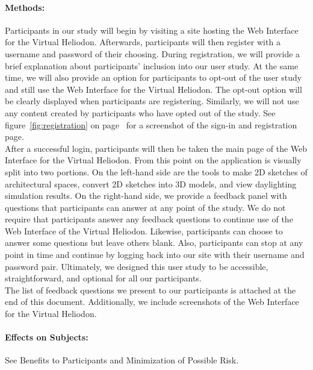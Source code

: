 \documentclass[12pt]{article}
\begin{document}

\paragraph{Methods:}
%
Participants in our study will begin by visiting a site hosting the Web Interface for the Virtual Heliodon. 
Afterwards, participants will then register with a username and password of their choosing.
During registration, we will provide a brief explanation about participants' inclusion into our user study.
At the same time, we will also provide an option for participants to opt-out of the user study and still use the Web Interface for the Virtual Heliodon. 
The opt-out option will be clearly displayed when participants are registering. 
Similarly, we will not use any content created by participants who have opted out of the study.
See figure~\ref{fig:registration} on page~\pageref{fig:registration} for a screenshot of the sign-in and registration page. \\

After a successful login, participants will then be taken the main page of the Web Interface for the Virtual Heliodon.
From this point on the application is visually split into two portions. 
On the left-hand side are the tools to make 2D sketches of architectural spaces, convert 2D sketches into 3D models, and view daylighting simulation results. 
On the right-hand side, we provide a feedback panel with questions that participants can answer at any point of the study. 
We do not require that participants answer any feedback questions to continue use of the Web Interface of the Virtual Heliodon. 
Likewise, participants can choose to answer some questions but leave others blank.
Also, participants can stop at any point in time and continue by logging back into our site with their username and password pair.
Ultimately, we designed this user study to be accessible, straightforward, and optional for all our participants. \\

The list of feedback questions we present to our participants is attached at the end of this document. 
Additionally, we include screenshots of the Web Interface for the Virtual Heliodon.

\paragraph{Effects on Subjects:} See Benefits to Participants and Minimization of Possible Risk.
\end{document}
